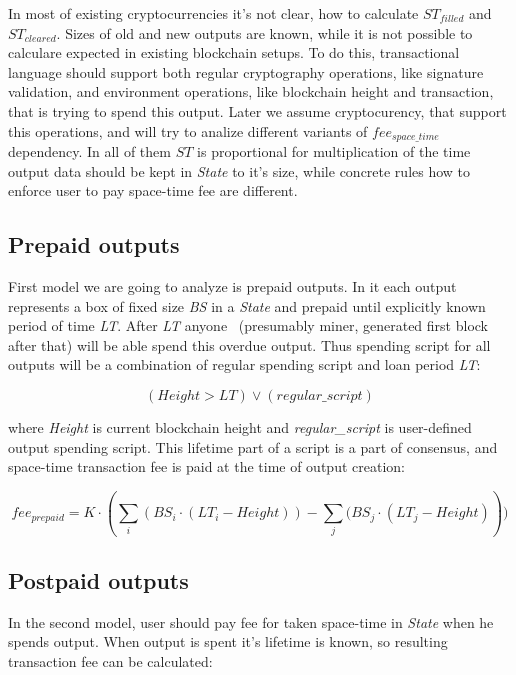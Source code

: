\documentclass[]{article}   %
\newcommand{\state}{\textit{State}}
\begin{document}
In most of existing cryptocurrencies it's not clear, how to calculate \textit{$ST_{filled}$} and \textit{$ST_{cleared}$}. Sizes of old and new outputs are known, while it is not possible to calculare expected in existing blockchain setups. To do this, transactional language should support both regular cryptography operations, like signature validation, and environment operations, like blockchain height and transaction, that is trying to spend this output. Later we assume cryptocurency, that support this operations, and will try to analize different variants of \textit{$fee_{space\_time}$} dependency. In all of them \textit{$ST$} is proportional for multiplication of the time output data should be kept in \state{} to it's size, while concrete rules how to enforce user to pay space-time fee are different.

\subsection{Prepaid outputs}

First model we are going to analyze is prepaid outputs. In it each output represents a box of fixed size \textit{BS} in a \state{} and prepaid until explicitly known period of time \textit{LT}. After \textit{LT} anyone ~(presumably miner, generated first block after that) will be able spend this overdue output. Thus spending script for all outputs will be a combination of regular spending script and loan period \textit{LT}:

\begin{equation}
(Height > LT) \lor (regular\_script)
\end{equation}

where \textit{Height} is current blockchain height and \textit{regular\_script} is user-defined output spending script. This lifetime part of a script is a part of consensus, and space-time transaction fee is paid at the time of output creation:

\begin{equation}
fee_{prepaid} = K \cdot (\sum_i{(BS_i \cdot (LT_i - Height))} - \sum_j{(BS_j \cdot (LT_j - Height)}))
\end{equation}

\subsection{Postpaid outputs}

In the second model, user should pay fee for taken space-time in \state{} when he spends output. When output is spent it's lifetime is known, so resulting transaction fee can be calculated:
\end{document}
